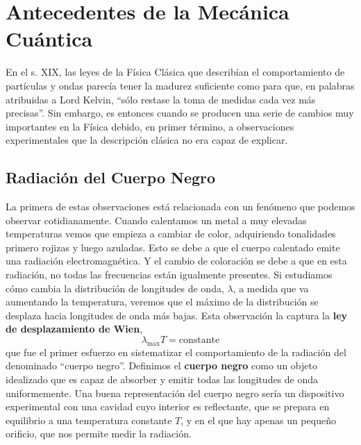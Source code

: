 \chapter{Antecedentes de la Mecánica Cuántica}
En el s. XIX, las leyes de la Física Clásica que describían 
el comportamiento de partículas y ondas parecía tener la madurez
suficiente como para que, en palabras atribuidas a Lord Kelvin,
``sólo restase la toma de medidas cada vez más 
precisas''. Sin embargo, 
es entonces cuando se producen una serie de cambios muy 
importantes  en la Física debido, en primer término, a
observaciones experimentales que la descripción 
clásica  no era capaz de explicar.

\section{Radiación del Cuerpo Negro}
La primera de estas observaciones está relacionada con un
fenómeno que podemos observar cotidianamente. Cuando calentamos un metal 
a muy elevadas temperaturas vemos que empieza a cambiar de 
color, adquiriendo tonalidades primero rojizas y luego azuladas.
Esto se debe a que  el cuerpo calentado emite una radiación
electromagnética. Y el cambio de coloración se debe a que 
en esta radiación, no todas las frecuencias 
están igualmente presentes. Si estudiamos cómo cambia la 
distribución de longitudes de onda, $\lambda$,  a medida que va 
aumentando la temperatura, veremos que el máximo de la distribución
se desplaza hacia longitudes de onda más bajas. Esta observación la
captura la \textbf{ley de desplazamiento de Wien},
\begin{equation}
\lambda_\mathrm{max}T=\mathrm{constante}
\label{eq:Wien}
\end{equation}
que fue el primer esfuerzo en sistematizar el comportamiento
de la radiación del denominado ``cuerpo negro''.
Definimos el \textbf{cuerpo negro} como un objeto 
idealizado que es capaz de absorber y emitir 
todas las longitudes de onda uniformemente. 
Una buena
representación del cuerpo negro sería un dispositivo experimental 
con una cavidad cuyo interior es reflectante, que se prepara en
equilibrio a una temperatura constante $T$, y en el que hay apenas 
un pequeño orificio, que nos permite medir la radiación. 


